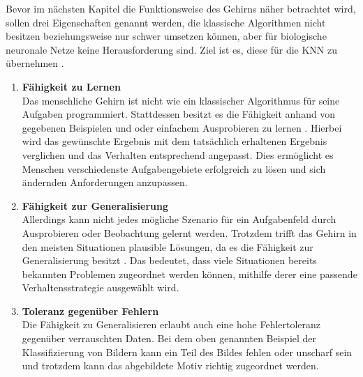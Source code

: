 Bevor im nächsten Kapitel die Funktionsweise des Gehirns näher betrachtet wird, sollen drei Eigenschaften genannt werden, die klassische Algorithmen nicht besitzen beziehungsweise nur schwer umsetzen können, aber für biologische neuronale Netze keine Herausforderung sind. Ziel ist es, diese für die \ac{KNN} zu übernehmen \cite{kriesel2008kleiner}.
\begin{enumerate}
	\item \textbf{ Fähigkeit zu Lernen} \\
	Das menschliche Gehirn ist nicht wie ein klassischer Algorithmus für seine Aufgaben programmiert. Stattdessen besitzt es die Fähigkeit anhand von gegebenen Beispielen und oder einfachem Ausprobieren zu lernen \cite{kriesel2008kleiner}. Hierbei wird das gewünschte Ergebnis mit dem tatsächlich erhaltenen Ergebnis verglichen und das Verhalten entsprechend angepasst. Dies ermöglicht es Menschen verschiedenste Aufgabengebiete erfolgreich zu lösen und sich ändernden Anforderungen anzupassen.
	
	\item \textbf{Fähigkeit zur Generalisierung}\\
	Allerdings kann nicht jedes mögliche Szenario für ein Aufgabenfeld durch Ausprobieren oder Beobachtung gelernt werden. Trotzdem trifft das Gehirn in den meisten Situationen plausible Lösungen, da es die Fähigkeit zur Generalisierung besitzt 
	\cite{kriesel2008kleiner}. Das bedeutet, dass viele Situationen bereits bekannten Problemen zugeordnet werden können, mithilfe derer eine passende Verhaltensstrategie ausgewählt wird. 
	
	\item \textbf{Toleranz gegenüber Fehlern}\\
	Die Fähigkeit zu Generalisieren erlaubt auch eine hohe Fehlertoleranz gegenüber verrauschten Daten. Bei dem oben genannten Beispiel der Klassifizierung von Bildern kann ein Teil des Bildes fehlen oder unscharf sein und trotzdem kann das abgebildete Motiv richtig zugeordnet werden.
\end{enumerate}

